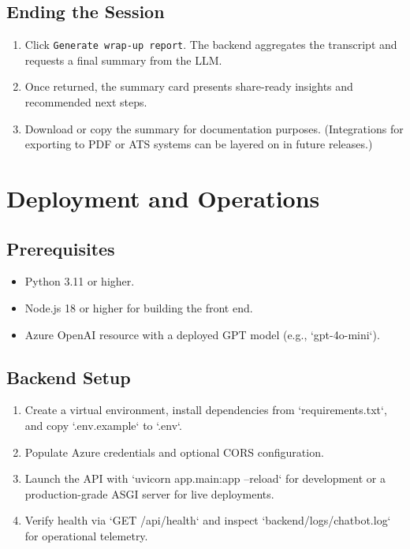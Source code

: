 \documentclass[11pt]{article}
\begin{document}
\subsection{Ending the Session}
\begin{enumerate}[leftmargin=*]
  \item Click \texttt{Generate wrap-up report}. The backend aggregates the transcript and requests a final summary from the LLM.
  \item Once returned, the summary card presents share-ready insights and recommended next steps.
  \item Download or copy the summary for documentation purposes. (Integrations for exporting to PDF or ATS systems can be layered on in future releases.)
\end{enumerate}

\section{Deployment and Operations}
\subsection{Prerequisites}
\begin{itemize}[leftmargin=*]
  \item Python 3.11 or higher.
  \item Node.js 18 or higher for building the front end.
  \item Azure OpenAI resource with a deployed GPT model (e.g., `gpt-4o-mini`).
\end{itemize}

\subsection{Backend Setup}
\begin{enumerate}[leftmargin=*]
  \item Create a virtual environment, install dependencies from `requirements.txt`, and copy `.env.example` to `.env`.
  \item Populate Azure credentials and optional CORS configuration.
  \item Launch the API with `uvicorn app.main:app --reload` for development or a production-grade ASGI server for live deployments.
  \item Verify health via `GET /api/health` and inspect `backend/logs/chatbot.log` for operational telemetry.
\end{enumerate}
\end{document}
